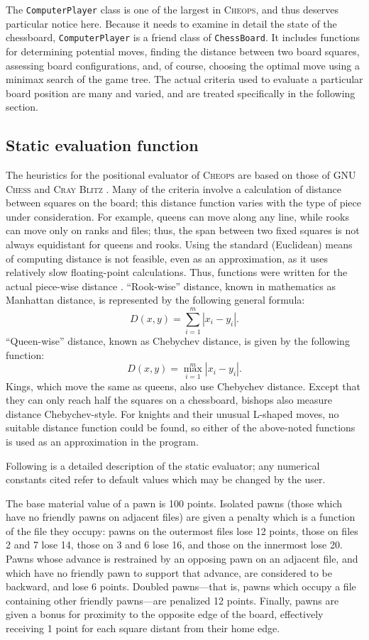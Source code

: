 \documentclass[a4paper]{article}
\begin{document}
The \texttt{ComputerPlayer} class is one of the largest in
\textsc{Cheops}, and thus deserves particular notice here. Because it
needs to examine in detail the state of the chessboard,
\texttt{ComputerPlayer} is a friend class of \texttt{ChessBoard}. It
includes functions for determining potential moves, finding the
distance between two board squares, assessing board configurations,
and, of course, choosing the optimal move using a minimax search of
the game tree. The actual criteria used to evaluate a particular board
position are many and varied, and are treated specifically in the
following section.

\subsection{Static evaluation function}

The heuristics for the positional evaluator of \textsc{Cheops} are
based on those of \textsc{GNU Chess} \cite{stanback} and \textsc{Cray
  Blitz} \cite{crayblitz}. Many of the criteria involve a calculation
of distance between squares on the board; this distance function
varies with the type of piece under consideration.  For example,
queens can move along any line, while rooks can move only on ranks and
files; thus, the span between two fixed squares is not always
equidistant for queens and rooks. Using the standard (Euclidean) means
of computing distance is not feasible, even as an approximation, as it
uses relatively slow floating-point calculations.  Thus, functions
were written for the actual piece-wise distance \cite{wilson}.
``Rook-wise'' distance, known in mathematics as Manhattan distance, is
represented by the following general formula: \[ D(x, y) =
\sum_{i=1}^{m} \left|x_i - y_i\right|. \] ``Queen-wise'' distance,
known as Chebychev distance, is given by the following function: \[
D(x, y) = \max_{i=1}^{m} \left|x_i - y_i\right|. \] Kings, which move
the same as queens, also use Chebychev distance. Except that they can
only reach half the squares on a chessboard, bishops also measure
distance Chebychev-style. For knights and their unusual L-shaped
moves, no suitable distance function could be found, so either of the
above-noted functions is used as an approximation in the program.

Following is a detailed description of the static evaluator; any
numerical constants cited refer to default values which may be changed
by the user.

The base material value of a pawn is 100 points. Isolated pawns (those
which have no friendly pawns on adjacent files) are given a penalty
which is a function of the file they occupy: pawns on the outermost
files lose 12 points, those on files 2 and 7 lose 14, those on 3 and 6
lose 16, and those on the innermost lose 20. Pawns whose advance is
restrained by an opposing pawn on an adjacent file, and which have no
friendly pawn to support that advance, are considered to be backward,
and lose 6 points. Doubled pawns---that is, pawns which occupy a file
containing other friendly pawns---are penalized 12 points. Finally,
pawns are given a bonus for proximity to the opposite edge of the
board, effectively receiving 1 point for each square distant from
their home edge.
\end{document}
